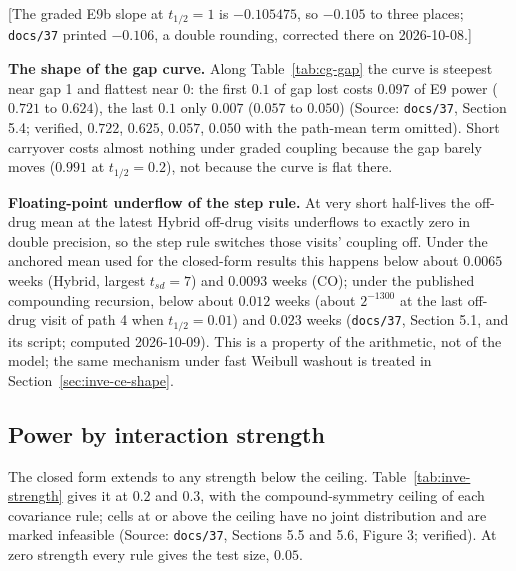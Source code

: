 \documentclass[11pt]{article}
\newcommand{\note}[1]{\textcolor{blue!60!black}{\small [#1]}}
\newcommand{\code}[1]{\texttt{#1}}
\begin{document}
\note{The graded E9b slope at $t_{1/2} = 1$ is $-0.105475$, so
$-0.105$ to three places; \code{docs/37} printed $-0.106$, a double
rounding, corrected there on 2026-10-08.}

\textbf{The shape of the gap curve.} Along Table~\ref{tab:cg-gap} the
curve is steepest near gap 1 and flattest near 0: the first $0.1$ of
gap lost costs $0.097$ of E9 power ($0.721$ to $0.624$), the last $0.1$
only $0.007$ ($0.057$ to $0.050$) (Source: \code{docs/37}, Section 5.4;
verified, $0.722$, $0.625$, $0.057$, $0.050$ with the path-mean term
omitted). Short carryover costs almost nothing under graded coupling
because the gap barely moves ($0.991$ at $t_{1/2} = 0.2$), not because
the curve is flat there.

\textbf{Floating-point underflow of the step rule.} At very short
half-lives the off-drug mean at the latest Hybrid off-drug visits
underflows to exactly zero in double precision, so the step rule
switches those visits' coupling off. Under the anchored mean used for
the closed-form results this happens below about $0.0065$ weeks
(Hybrid, largest $t_{sd} = 7$) and $0.0093$ weeks (CO); under the
published compounding recursion, below about $0.012$ weeks (about
$2^{-1300}$ at the last off-drug visit of path 4 when $t_{1/2} = 0.01$)
and $0.023$ weeks (\code{docs/37}, Section 5.1, and its script;
computed 2026-10-09).
This is a property of the arithmetic, not of the model; the same
mechanism under fast Weibull washout is treated in
Section~\ref{sec:inve-ce-shape}.

\subsection{Power by interaction strength}
\label{sec:inve-cg-strength}

The closed form extends to any strength below the ceiling.
Table~\ref{tab:inve-strength} gives it at $0.2$ and $0.3$, with the
compound-symmetry ceiling of each covariance rule; cells at or above the
ceiling have no joint distribution and are marked infeasible (Source:
\code{docs/37}, Sections 5.5 and 5.6, Figure 3; verified). At zero
strength every rule gives the test size, $0.05$.
\end{document}
